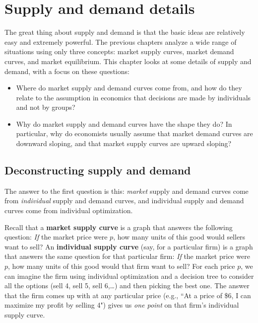 \chapter{Supply and demand details}%
\label{3details}

The great thing about supply and demand is that the basic ideas are relatively easy and extremely powerful. The previous chapters analyze a wide range of situations using only three concepts: market supply curves, market demand curves, and market equilibrium. This chapter looks at some details of supply and demand, with a focus on these questions:
\begin{itemize}
\item Where do market supply and demand curves come from, and how do they relate to the assumption in economics that decisions are made by individuals and not by groups? 
\item Why do market supply and demand curves have the shape they do? In particular, why do economists usually assume that market demand curves are downward sloping, and that market supply curves are upward sloping?
\end{itemize}


\section{Deconstructing supply and demand}

The answer to the first question is this: \emph{market} supply and demand curves come from \emph{individual} supply and demand curves, and individual supply and demand curves come from individual optimization. 

Recall that a \textbf{market supply curve} is a graph that answers the following question: \emph{If} the market price were $p$, how many units of this good would sellers want to sell? An \textbf{individual supply curve} (say, for a particular firm) is a graph that answers the same question for that particular firm: \emph{If} the market price were $p$, how many units of this good would that firm want to sell? For each price $p$, we can imagine the firm using individual optimization and a decision tree to consider all the options (sell 4, sell 5, sell 6,\ldots) and then picking the best one. The answer that the firm comes up with at any particular price (e.g., ``At a price of \$6, I can maximize my profit by selling 4") gives us \emph{one point} on that firm's individual supply curve.


